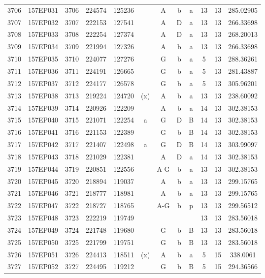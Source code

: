 \begin{tabular}{|*{12}{c|}}
3706 & 157EP031 & 3706 & 224574 & 125236 &  & A & b & a & 13 & 13 & 285.02905 \\ 
3707 & 157EP032 & 3707 & 222153 & 127541 &  & A & D & a & 13 & 13 & 266.33698 \\ 
3708 & 157EP033 & 3708 & 222254 & 127374 &  & A & D & a & 13 & 13 & 268.20013 \\ 
3709 & 157EP034 & 3709 & 221994 & 127326 &  & A & b & a & 13 & 13 & 266.33698 \\ 
3710 & 157EP035 & 3710 & 224077 & 127276 &  & G & b & a & 5 & 13 & 288.36261 \\ 
3711 & 157EP036 & 3711 & 224191 & 126665 &  & G & b & a & 5 & 13 & 281.43887 \\ 
3712 & 157EP037 & 3712 & 224177 & 126578 &  & G & b & a & 5 & 13 & 305.96201 \\ 
3713 & 157EP038 & 3713 & 219224 & 124720 & (x) & A & b & a & 13 & 13 & 238.60092 \\ 
3714 & 157EP039 & 3714 & 220926 & 122209 &  & A & b & a & 14 & 13 & 302.38153 \\ 
3715 & 157EP040 & 3715 & 221071 & 122254 & a & G & D & B & 14 & 13 & 302.38153 \\ 
3716 & 157EP041 & 3716 & 221153 & 122389 &  & G & b & B & 14 & 13 & 302.38153 \\ 
3717 & 157EP042 & 3717 & 221407 & 122498 & a & G & D & B & 14 & 13 & 303.99097 \\ 
3718 & 157EP043 & 3718 & 221029 & 122381 &  & A & D & a & 14 & 13 & 302.38153 \\ 
3719 & 157EP044 & 3719 & 220851 & 122556 &  & A-G & b & a & 13 & 13 & 302.38153 \\ 
3720 & 157EP045 & 3720 & 218894 & 119037 &  & A & b & a & 13 & 13 & 299.15765 \\ 
3721 & 157EP046 & 3721 & 218777 & 118981 &  & A & b & a & 13 & 13 & 299.15765 \\ 
3722 & 157EP047 & 3722 & 218727 & 118765 &  & A-G & b & p & 13 & 13 & 299.56512 \\ 
3723 & 157EP048 & 3723 & 222219 & 119749 &  &  &  &  & 13 & 13 & 283.56018 \\ 
3724 & 157EP049 & 3724 & 221748 & 119680 &  & G & b & B & 13 & 13 & 283.56018 \\ 
3725 & 157EP050 & 3725 & 221799 & 119751 &  & G & b & B & 13 & 13 & 283.56018 \\ 
3726 & 157EP051 & 3726 & 224413 & 118511 & (x) & A & b & a & 5 & 15 & 338.0061 \\ 
3727 & 157EP052 & 3727 & 224495 & 119212 &  & G & b & B & 5 & 15 & 294.36566 \\ 

\end{tabular}
